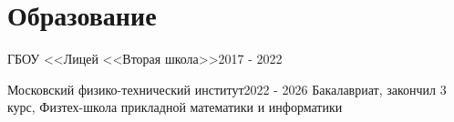 \section{\textbf{Образование}}
\resumeSubHeadingListStart

\resumePOR
{ГБОУ <<Лицей <<Вторая школа>>}{}{2017 - 2022}

\resumeSubHeading
{Московский физико-технический институт}{2022 - 2026}
{Бакалавриат, закончил 3 курс, Физтех-школа прикладной математики и информатики}

\resumeSubHeadingListEnd
